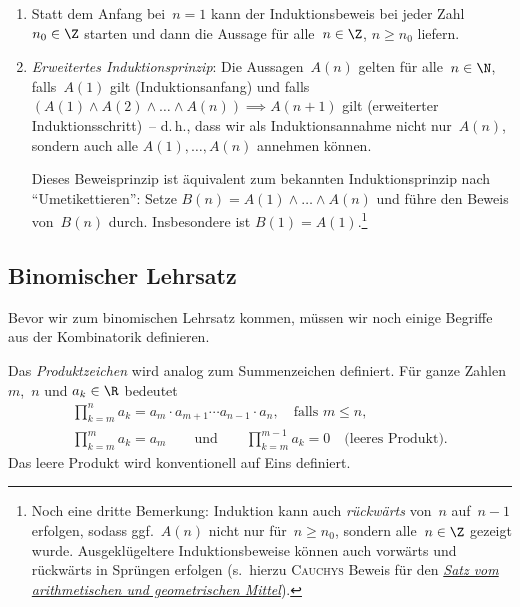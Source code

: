 \documentclass[a4paper]{article}
\begin{document}
\begin{remark}\leavevmode
    \begin{enumerate}
        \item Statt dem Anfang bei~$n = 1$ kann der Induktionsbeweis bei jeder Zahl~$n_0 \in \Z$ starten und dann die Aussage für alle~$n \in \Z$, $n \geq n_0$ liefern.
        \item \emph{Erweitertes Induktionsprinzip}: Die Aussagen~$A(n)$ gelten für alle~$n \in \N$, falls~$A(1)$ gilt (Induktionsanfang) und falls $(A(1) \wedge A(2) \wedge \dots \wedge A(n)) \implies A(n + 1)$ gilt (erweiterter Induktionsschritt)~-- d.\,h., dass wir als Induktionsannahme nicht nur~$A(n)$, sondern auch alle $A(1), \dots, A(n)$ annehmen können.

              Dieses Beweisprinzip ist äquivalent zum bekannten Induktionsprinzip nach "`Umetikettieren"': Setze $B(n) = A(1) \wedge \dots \wedge A(n)$ und führe den Beweis von~$B(n)$ durch. Insbesondere ist $B(1) = A(1)$.\footnote{Noch eine dritte Bemerkung: Induktion kann auch \emph{rückwärts} von~$n$ auf~$n - 1$ erfolgen, sodass ggf.\ $A(n)$ nicht nur für~$n \geq n_0$, sondern alle~$n \in \Z$ gezeigt wurde. Ausgeklügeltere Induktionsbeweise können auch vorwärts und rückwärts in Sprüngen erfolgen (s.~hierzu \textsc{Cauchys} Beweis für den \href{https://de.wikipedia.org/wiki/Ungleichung_vom_arithmetischen_und_geometrischen_Mittel\#Beweis_mit_Vorw\%C3\%A4rts-R\%C3\%BCckw\%C3\%A4rts-Induktion}{\emph{Satz vom arithmetischen und geometrischen Mittel}}).}
    \end{enumerate}
\end{remark}

\subsection{Binomischer Lehrsatz}

Bevor wir zum binomischen Lehrsatz kommen, müssen wir noch einige Begriffe aus der Kombinatorik definieren.

\begin{notation}[Produktzeichen]
    Das \emph{Produktzeichen} wird analog zum Summenzeichen definiert. Für ganze Zahlen $m$,~$n$ und $a_k \in \R$ bedeutet
    \begin{gather*}
        \prod_{k=m}^n a_k = a_m \cdot a_{m+1} \cdots a_{n-1} \cdot a_n, \quad\text{falls } m \leq n, \\
        \prod_{k=m}^m a_k = a_m \qquad\text{und}\qquad \prod_{k=m}^{m-1} a_k = 0 \quad\text{(leeres Produkt)}.
    \end{gather*}
    Das leere Produkt wird konventionell auf Eins definiert.
\end{notation}
\end{document}
